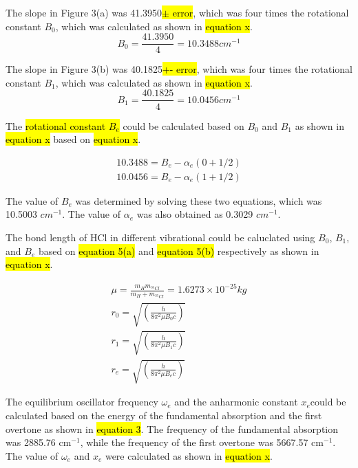 \documentclass[twocolumn]{article} %
\begin{document}
The slope in Figure 3(a) was 41.3950\hl{$\pm$ error}, which was four times the rotational constant $B_0$, which was calculated as shown in \hl{equation x}.
\begin{equation}
    B_0 = \frac{41.3950}{4} = 10.3488  cm^{-1}
\end{equation}

The slope in Figure 3(b) was 40.1825\hl{+- error}, which was four times the rotational constant $B_1$, which was calculated as shown in \hl{equation x}.
\begin{equation}
    B_1 = \frac{40.1825}{4} = 10.0456  cm^{-1}
\end{equation}

The \hl{rotational constant $B_e$} could be calculated based on $B_0$ and $B_1$ as shown in \hl{equation x} based on \hl{equation x}.

\begin{subequations}
    \begin{align}
        10.3488 = B_e - \alpha_e (0+1/2)\\
        10.0456 = B_e - \alpha_e (1+1/2)
    \end{align}
\end{subequations}

The value of $B_e$ was determined by solving these two equations, which was 10.5003 $cm^{-1}$. The value of $\alpha_e$ was also obtained as 0.3029 $cm^{-1}$.

The bond length of HCl in different vibrational could be caluclated using $B_0$, $B_1$, and $B_e$ based on \hl{equation 5(a)} and \hl{equation 5(b)} respectively as shown in \hl{equation x}. 


\begin{subequations}
    \begin{gather}
        \mu = \frac{m_H m_{^{35}Cl}}{m_{H}+m_{^{35}Cl}} = 1.6273 \times 10^{-25} kg\\
        r_0 = \sqrt{(\frac{h}{8\pi^2\mu B_0 c})}\\
        r_1 = \sqrt{(\frac{h}{8\pi^2\mu B_1 c})}\\
        r_e = \sqrt{(\frac{h}{8\pi^2\mu B_e c})}
    \end{gather}
\end{subequations}


The equilibrium oscillator frequency $\omega_e$ and the anharmonic constant $x_e$could be calculated based on the energy of the fundamental absorption and the first overtone as shown in \hl{equation 3}. The frequency of the fundamental absorption was 2885.76 cm$^{-1}$, while the frequency of the first overtone was 5667.57 cm$^{-1}$. The value of $\omega_e$ and $x_e$ were calculated as shown in \hl{equation x}.
\end{document}
